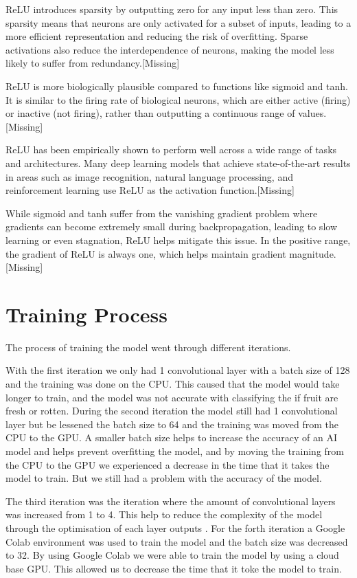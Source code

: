 \documentclass[conference]{IEEEtran}
\begin{document}
ReLU introduces sparsity by outputting zero for any input less than zero. This sparsity means that neurons are only activated for a subset of inputs, leading to a more efficient representation and reducing the risk of overfitting. Sparse activations also reduce the interdependence of neurons, making the model less likely to suffer from redundancy.[Missing]

ReLU is more biologically plausible compared to functions like sigmoid and tanh. It is similar to the firing rate of biological neurons, which are either active (firing) or inactive (not firing), rather than outputting a continuous range of values.[Missing]

ReLU has been empirically shown to perform well across a wide range of tasks and architectures. Many deep learning models that achieve state-of-the-art results in areas such as image recognition, natural language processing, and reinforcement learning use ReLU as the activation function.[Missing]

While sigmoid and tanh suffer from the vanishing gradient problem where gradients can become extremely small during backpropagation, leading to slow learning or even stagnation, ReLU helps mitigate this issue. In the positive range, the gradient of ReLU is always one, which helps maintain gradient magnitude.[Missing]

\section{Training Process}

The process of training the model went through different iterations.

With the first iteration we only had 1 convolutional layer with a batch size of 128 and the training was done on the CPU. This caused that the model would take longer to train, and the model was not accurate with classifying the if fruit are fresh or rotten. During the second iteration the model still had 1 convolutional layer but be lessened the batch size to 64 and the training was moved from the CPU to the GPU. A smaller batch size helps to increase the accuracy of an AI model \cite{b2} and helps prevent overfitting the model, and by moving the training from the CPU to the GPU we experienced a decrease in the time that it takes the model to train. But we still had a problem with the accuracy of the model.

The third iteration was the iteration where the amount of convolutional layers was increased from 1 to 4. This help to reduce the complexity of the model through the optimisation of each layer outputs \cite{b3}. For the forth iteration a Google Colab environment was used to train the model and the batch size was decreased to 32. By using Google Colab we were able to train the model by using a cloud base GPU. This allowed us to decrease the time that it toke the model to train.
\end{document}
